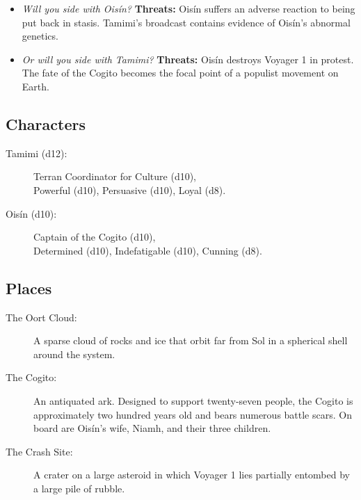 \documentclass[11pt, a5paper, parskip=half-, DIV=12]{scrartcl}
\begin{document}
\begin{itemize}
	\item \textit{Will you side with Ois\'in?} \textbf{Threats:} Ois\'in suffers an adverse reaction to being put back in stasis. Tamimi's broadcast contains evidence of Ois\'in's abnormal genetics.
	\item \textit{Or will you side with Tamimi?} \textbf{Threats:} Ois\'in destroys Voyager 1 in protest. The fate of the Cogito becomes the focal point of a populist movement on Earth.%
\end{itemize}

\newpage

\subsection*{Characters}
\begin{description}
	\item[Tamimi (d12):] Terran Coordinator for Culture (d10), \\ Powerful (d10), Persuasive (d10), Loyal (d8).
	\item[Ois\'in (d10):] Captain of the Cogito (d10), \\ Determined (d10), Indefatigable (d10), Cunning (d8).
\end{description}

\subsection*{Places}
\begin{description}
	\item[The Oort Cloud:] A sparse cloud of rocks and ice that orbit far from Sol in a spherical shell around the system.
	\item[The Cogito:] An antiquated ark. Designed to support twenty-seven people, the Cogito is approximately two hundred years old and bears numerous battle scars. On board are Ois\'in's wife, Niamh, and their three children.
	\item[The Crash Site:] A crater on a large asteroid in which Voyager 1 lies partially entombed by a large pile of rubble.
\end{description}
\end{document}
